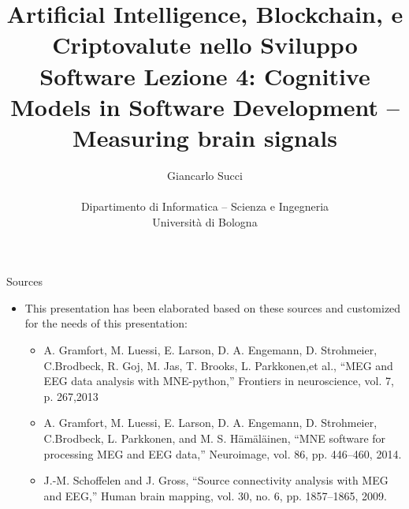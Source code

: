 \documentclass{beamer}
\title[L04]{Artificial Intelligence, Blockchain, e Criptovalute nello Sviluppo Software \newline\newline
Lezione 4: Cognitive Models in Software Development -- Measuring brain signals} %
\author[{\tiny Giancarlo Succi }]{Giancarlo Succi\\\\ Dipartimento di Informatica -- Scienza e Ingegneria\\Universit\`{a} di Bologna\\
\bftt{g.succi@unibo.it}
} %
\institute[unibo] %
\date{} %
\begin{document}
\begin{frame}
\titlepage %

\end{frame}





\begin{frame}
{\centerline{Sources}}
\begin{itemize}
    \item This presentation has been elaborated  based on these sources and customized for the needs of this presentation:
    \begin{itemize}
        \item  A. Gramfort, M. Luessi, E. Larson, D. A. Engemann, D. Strohmeier, C.Brodbeck, R. Goj, M. Jas, T. Brooks, L. Parkkonen,et al., ``MEG and EEG data analysis with MNE-python,'' Frontiers in neuroscience, vol. 7, p. 267,2013
        \item A. Gramfort, M. Luessi, E. Larson, D. A. Engemann, D. Strohmeier, C.Brodbeck, L. Parkkonen, and M. S. H\"{a}m\"{a}l\"{a}inen, ``MNE software for processing MEG and EEG data,'' Neuroimage, vol. 86, pp. 446–460, 2014.
        \item J.-M. Schoffelen and J. Gross, ``Source connectivity analysis with MEG and EEG,'' Human brain mapping, vol. 30, no. 6, pp. 1857–1865, 2009.
    \end{itemize}
\end{itemize}
\end{frame}
\end{document}

